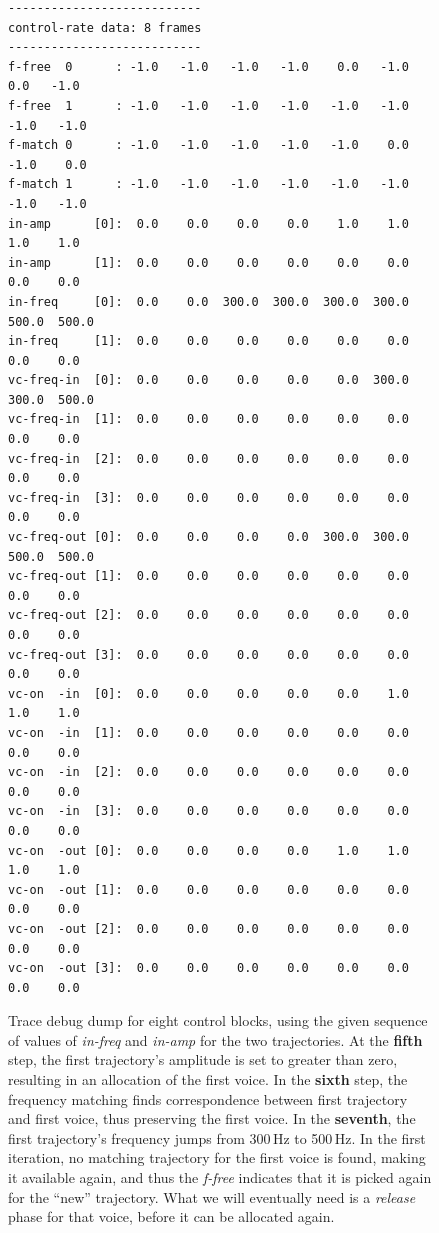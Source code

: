\documentclass[11pt,a4paper]{article}
\begin{document}
\begin{figure}
\begin{lstlisting}[style=plain]
---------------------------
control-rate data: 8 frames
---------------------------
f-free  0      : -1.0   -1.0   -1.0   -1.0    0.0   -1.0    0.0   -1.0    
f-free  1      : -1.0   -1.0   -1.0   -1.0   -1.0   -1.0   -1.0   -1.0    
f-match 0      : -1.0   -1.0   -1.0   -1.0   -1.0    0.0   -1.0    0.0    
f-match 1      : -1.0   -1.0   -1.0   -1.0   -1.0   -1.0   -1.0   -1.0    
in-amp      [0]:  0.0    0.0    0.0    0.0    1.0    1.0    1.0    1.0    
in-amp      [1]:  0.0    0.0    0.0    0.0    0.0    0.0    0.0    0.0    
in-freq     [0]:  0.0    0.0  300.0  300.0  300.0  300.0  500.0  500.0    
in-freq     [1]:  0.0    0.0    0.0    0.0    0.0    0.0    0.0    0.0    
vc-freq-in  [0]:  0.0    0.0    0.0    0.0    0.0  300.0  300.0  500.0    
vc-freq-in  [1]:  0.0    0.0    0.0    0.0    0.0    0.0    0.0    0.0    
vc-freq-in  [2]:  0.0    0.0    0.0    0.0    0.0    0.0    0.0    0.0    
vc-freq-in  [3]:  0.0    0.0    0.0    0.0    0.0    0.0    0.0    0.0    
vc-freq-out [0]:  0.0    0.0    0.0    0.0  300.0  300.0  500.0  500.0    
vc-freq-out [1]:  0.0    0.0    0.0    0.0    0.0    0.0    0.0    0.0    
vc-freq-out [2]:  0.0    0.0    0.0    0.0    0.0    0.0    0.0    0.0    
vc-freq-out [3]:  0.0    0.0    0.0    0.0    0.0    0.0    0.0    0.0    
vc-on  -in  [0]:  0.0    0.0    0.0    0.0    0.0    1.0    1.0    1.0    
vc-on  -in  [1]:  0.0    0.0    0.0    0.0    0.0    0.0    0.0    0.0    
vc-on  -in  [2]:  0.0    0.0    0.0    0.0    0.0    0.0    0.0    0.0    
vc-on  -in  [3]:  0.0    0.0    0.0    0.0    0.0    0.0    0.0    0.0    
vc-on  -out [0]:  0.0    0.0    0.0    0.0    1.0    1.0    1.0    1.0    
vc-on  -out [1]:  0.0    0.0    0.0    0.0    0.0    0.0    0.0    0.0    
vc-on  -out [2]:  0.0    0.0    0.0    0.0    0.0    0.0    0.0    0.0    
vc-on  -out [3]:  0.0    0.0    0.0    0.0    0.0    0.0    0.0    0.0    
\end{lstlisting}%
\caption{Trace debug dump for eight control blocks, using the given sequence of values of \emph{in-freq} and \emph{in-amp} for the two trajectories. At the \textbf{fifth} step, the first trajectory's amplitude is set to greater than zero, resulting in an allocation of the first voice. In the \textbf{sixth} step, the frequency matching finds correspondence between first trajectory and first voice, thus preserving the first voice. In the \textbf{seventh}, the first trajectory's frequency jumps from 300\,Hz to 500\,Hz. In the first iteration, no matching trajectory for the first voice is found, making it available again, and thus the \emph{f-free} indicates that it is picked again for the ``new'' trajectory. What we will eventually need is a \emph{release} phase for that voice, before it can be allocated again.}%
\label{fig:trace-dump-voices}%
\end{figure}
\end{document}
